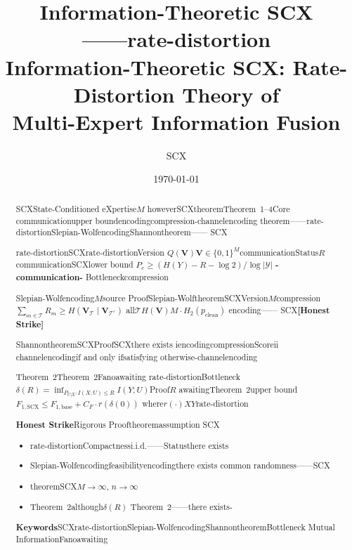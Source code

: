\documentclass[11pt,a4paper]{article}
\title{\textbf{\LARGE Information-Theoretic SCX\\[6pt]
——rate-distortion}\\[12pt]
\large Information-Theoretic SCX: Rate-Distortion Theory of\\Multi-Expert Information Fusion}
\author{SCX}
\date{\today}
\theoremstyle{remark}
\newcommand{\Y}{\mathcal{Y}}
\newcommand{\honeststrike}{\textnormal{\textbf{[Honest Strike]}}}
\begin{document}
\maketitle

\begin{abstract}
SCXState-Conditioned eXpertise$M$
howeverSCXtheoremTheorem~1--4Core
communicationupper boundencodingcompression-channelencoding
theorem——rate-distortionSlepian-WolfencodingShannontheorem——
SCX

\textbf{}rate-distortionSCXrate-distortionVersion
$Q(\mathbf{V})$$\mathbf{V} \in \{0,1\}^M$communicationStatus$R$
communicationSCXlower bound
$P_e \geq (H(Y) - R - \log 2) / \log |\Y|$
\textbf{-communication-}
Bottleneckcompression

\textbf{}Slepian-Wolfencoding$M$source
ProofSlepian-WolftheoremSCXVersion$M$compression
$\sum_{m \in \mathcal{T}} R_m \geq H(\mathbf{V}_\mathcal{T} \mid \mathbf{V}_{\mathcal{T}^c})$
all$\mathcal{T}$$H(\mathbf{V})$$M \cdot H_2(p_{\text{clean}})$
\textbf{}encoding——
SCX\honeststrike{}

\textbf{}ShannontheoremSCXProofSCXthere exists
iencodingcompressionScoreii
channelencodingif and only ifsatisfying
otherwise-channelencoding

\textbf{}Theorem~2Theorem~2Fanoawaiting
rate-distortionBottleneck\textbf{}
$\delta(R) = \inf_{P_{U|X}: I(X;U) \leq R} I(Y; U)$Proof$R$
awaitingTheorem~2upper bound
$F_{1,\text{SCX}} \leq F_{1,\text{base}} + C_F \cdot r(\delta(0))$
where$r(\cdot)$$X$$Y$rate-distortion

\textbf{Honest Strike}Rigorous Prooftheoremassumption
SCX\textbf{}

\begin{itemize}
    \item rate-distortionCompactnessi.i.d.\assumption——Statusthere exists
    \item Slepian-Wolfencodingfeasibilityencodingthere exists\textbf{}
          common randomness——SCX
    \item theoremSCX\textbf{}$M \to \infty$, $n \to \infty$
          
    \item Theorem~2although$\delta(R)$
          Theorem~2——there exists-
\end{itemize}

\textbf{Keywords}SCXrate-distortionSlepian-WolfencodingShannontheoremBottleneck
Mutual InformationFanoawaiting
\end{abstract}
\end{document}
